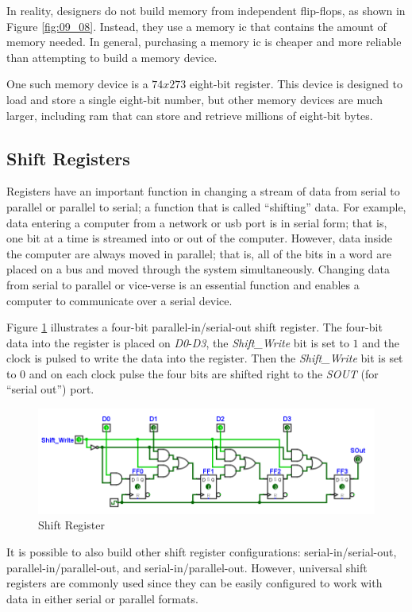 In reality, designers do not build memory from independent flip-flops, as shown in Figure \ref{fig:09_08}. Instead, they use a memory \gls{ic} that contains the amount of memory needed. In general, purchasing a memory \gls{ic} is cheaper and more reliable than attempting to build a memory device.

One such memory device is a $ 74x273 $ eight-bit register. This device is designed to load and store a single eight-bit number, but other memory devices are much larger, including \gls{ram} that can store and retrieve millions of eight-bit bytes.

\subsection{Shift Registers}
\label{SL:subsec:shift_registers}

Registers have an important function in changing a stream of data from serial to parallel or parallel to serial; a function that is called ``shifting'' data. For example, data entering a computer from a network or \gls{usb} port is in serial form; that is, one bit at a time is streamed into or out of the computer. However, data inside the computer are always moved in parallel; that is, all of the bits in a word are placed on a bus and moved through the system simultaneously. Changing data from serial to parallel or vice-verse is an essential function and enables a computer to communicate over a serial device.

Figure \ref{fig:09_09} illustrates a four-bit parallel-in/serial-out shift register. The four-bit data into the register is placed on \emph{D0}-\emph{D3}, the \emph{Shift\_Write} bit is set to $ 1 $ and the clock is pulsed to write the data into the register. Then the \emph{Shift\_Write} bit is set to $ 0 $ and on each clock pulse the four bits are shifted right to the \emph{SOUT} (for ``serial out'') port.

\begin{figure}[H]
	\centering
	\includegraphics[width=\maxwidth{.95\linewidth}]{gfx/09_09}
	\caption{Shift Register}
	\label{fig:09_09}
\end{figure}

It is possible to also build other shift register configurations: serial-in/serial-out, parallel-in/parallel-out, and serial-in/parallel-out. However, universal shift registers are commonly used since they can be easily configured to work with data in either serial or parallel formats.

